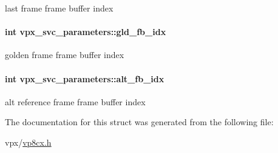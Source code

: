 last frame frame buffer index \hypertarget{structvpx__svc__parameters_a1465c3f1805fe1ccf45835b980ee113e}{
\paragraph[{gld\-\_\-fb\-\_\-idx}]{\setlength{\rightskip}{0pt plus 5cm}int {\bf vpx\-\_\-svc\-\_\-parameters\-::gld\-\_\-fb\-\_\-idx}}}\label{structvpx__svc__parameters_a1465c3f1805fe1ccf45835b980ee113e}
golden frame frame buffer index \hypertarget{structvpx__svc__parameters_acca4a8ad748ae875e046daece3cd6590}{
\paragraph[{alt\-\_\-fb\-\_\-idx}]{\setlength{\rightskip}{0pt plus 5cm}int {\bf vpx\-\_\-svc\-\_\-parameters\-::alt\-\_\-fb\-\_\-idx}}}\label{structvpx__svc__parameters_acca4a8ad748ae875e046daece3cd6590}
alt reference frame frame buffer index 

\-The documentation for this struct was generated from the following file\-:\begin{DoxyCompactItemize}
\item 
vpx/\hyperlink{vp8cx_8h}{vp8cx.\-h}\end{DoxyCompactItemize}
